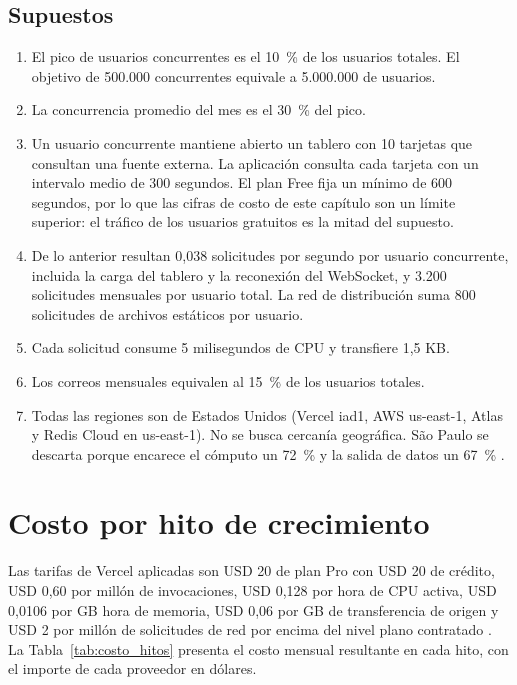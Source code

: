 \subsection{Supuestos}
\begin{enumerate}
  \item El pico de usuarios concurrentes es el 10~\% de los usuarios totales. El objetivo de 500.000 concurrentes equivale a 5.000.000 de usuarios.
  \item La concurrencia promedio del mes es el 30~\% del pico.
  \item Un usuario concurrente mantiene abierto un tablero con 10 tarjetas que consultan una fuente externa. La aplicación consulta cada tarjeta con un intervalo medio de 300 segundos. El plan Free fija un mínimo de 600 segundos, por lo que las cifras de costo de este capítulo son un límite superior: el tráfico de los usuarios gratuitos es la mitad del supuesto.
  \item De lo anterior resultan 0,038 solicitudes por segundo por usuario concurrente, incluida la carga del tablero y la reconexión del WebSocket, y 3.200 solicitudes mensuales por usuario total. La red de distribución suma 800 solicitudes de archivos estáticos por usuario.
  \item Cada solicitud consume 5 milisegundos de CPU y transfiere 1,5 KB.
  \item Los correos mensuales equivalen al 15~\% de los usuarios totales.
  \item Todas las regiones son de Estados Unidos (Vercel iad1, AWS us-east-1, Atlas y Redis Cloud en us-east-1). No se busca cercanía geográfica. São Paulo se descarta porque encarece el cómputo un 72~\% y la salida de datos un 67~\% \cite{vercel_regional_pricing}.
\end{enumerate}

\section{Costo por hito de crecimiento}
Las tarifas de Vercel aplicadas son USD 20 de plan Pro con USD 20 de crédito, USD 0,60 por millón de invocaciones, USD 0,128 por hora de CPU activa, USD 0,0106 por GB hora de memoria, USD 0,06 por GB de transferencia de origen y USD 2 por millón de solicitudes de red por encima del nivel plano contratado \cite{vercel_pricing, vercel_functions_pricing}. La Tabla~\ref{tab:costo_hitos} presenta el costo mensual resultante en cada hito, con el importe de cada proveedor en dólares.

